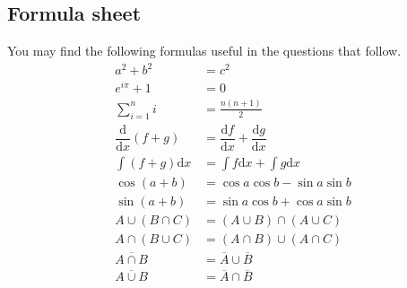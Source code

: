 \documentclass[12pt]{exam}
\newcommand{\dee}[1]{{\mathrm{d}#1}}
\newcommand{\diff}[2]{\dfrac{\dee{#1}}{\dee{#2}}}
\begin{document}
\vfill
\subsection*{Formula sheet}
You may find the following formulas useful in the questions that follow.
\begin{align*}
	a^2 + b^2           & = c^2                             \\
	e^{i\pi}+1          & = 0                               \\
	\sum_{i=1}^n i      & = \frac{n(n+1)}{2}                \\
	\diff{}{x}(f+g)     & = \diff{f}{x}+\diff{g}{x}         \\
	\int (f+g)\dee{x}   & = \int f \dee{x} + \int g \dee{x} \\
	\cos(a+b)           & = \cos a \cos b - \sin a \sin b   \\
	\sin(a+b)           & = \sin a \cos b + \cos a \sin b   \\
	A \cup (B \cap C)   & = (A\cup B) \cap (A \cup C)       \\
	A \cap (B \cup C)   & = (A\cap B) \cup (A \cap C)       \\
	\overline{A \cap B} & = \overline{A} \cup \overline{B}  \\
	\overline{A \cup B} & = \overline{A} \cap \overline{B}
\end{align*}
\vfill

\newpage
\end{document}

